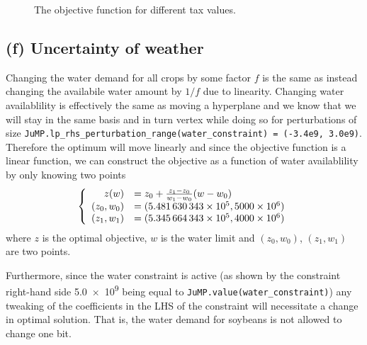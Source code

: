 \documentclass{article}
\begin{document}
\begin{figure}
	\centering
	\caption{The objective function for different tax values. \label{fig:tax_objective}}
\end{figure}

\subsection{(f) Uncertainty of weather}\label{sec:3f}
Changing the water demand for all crops by some factor $f$
is the same as instead changing the availabile water amount
by $1/f$ due to linearity.
Changing water availablility is effectively the same as moving a hyperplane
and we know that we will stay in the same basis and in turn vertex
while doing so for perturbations of size
\verb+JuMP.lp_rhs_perturbation_range(water_constraint) = (-3.4e9, 3.0e9)+.
Therefore the optimum will move linearly
and since the objective function is a linear function,
we can construct the objective as a function of water availablility
by only knowing two points
$$ \left\{ \begin{array}{r l}
	z(w) &= z_0 + \frac{z_1 - z_0}{w_1 - w_0} (w - w_0) \\
	(z_0, w_0) &= (\num{5.481630343e+05}, \num{5000e6}) \\
	(z_1, w_1) &= (\num{5.345664343e+05}, \num{4000e6})
\end{array} \right.
	$$
where $z$ is the optimal objective, $w$ is the water limit
and $(z_0, w_0)$, $(z_1, w_1)$ are two points.

Furthermore, since the water constraint is active
(as shown by the constraint right-hand side \num{5.0e9} being equal to
\verb+JuMP.value(water_constraint)+)
any tweaking of the coefficients in the LHS of the constraint
will necessitate a change in optimal solution.
That is, the water demand for soybeans is not allowed to change one bit.
\end{document}
